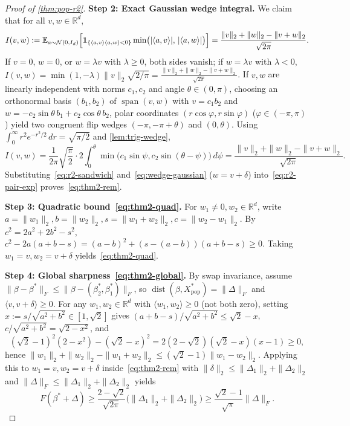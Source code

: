 \documentclass[11pt]{article}
\theoremstyle{plain}
\theoremstyle{remark}
\numberwithin{equation}{section}
\newcommand{\R}{\mathbb{R}}
\newcommand{\E}{\mathbb{E}}
\newcommand{\ind}{\mathbf{1}}
\newcommand{\ip}[2]{\langle #1, #2 \rangle}
\newcommand{\norm}[1]{\|#1\|}
\newcommand{\dist}{\operatorname{dist}}
\newcommand{\Fnorm}[1]{\|#1\|_F}
\begin{document}
\begin{proof}[Proof of \cref{thm:pop-r2}]
\textbf{Step 2: Exact Gaussian wedge integral.}
We claim that for all $v, w \in \R^d$,
\begin{equation}
  \label{eq:wedge-gaussian}
  I(v, w) := \E_{a \sim \mathcal{N}(0, I_d)}\Bigl[\ind_{\{\ip{a}{v}\ip{a}{w} < 0\}} \min\bigl(|\ip{a}{v}|,\, |\ip{a}{w}|\bigr)\Bigr]
  = \frac{\norm{v}_2 + \norm{w}_2 - \norm{v + w}_2}{\sqrt{2\pi}}.
\end{equation}
If $v = 0$, $w = 0$, or $w = \lambda v$ with $\lambda \ge 0$, both sides vanish; if $w = \lambda v$ with $\lambda < 0$, $I(v, w) = \min(1, -\lambda)\norm{v}_2\sqrt{2/\pi} = \frac{\norm{v}_2 + \norm{w}_2 - \norm{v+w}_2}{\sqrt{2\pi}}$. If $v, w$ are linearly independent with norms $c_1, c_2$ and angle $\theta \in (0, \pi)$, choosing an orthonormal basis $(b_1, b_2)$ of $\operatorname{span}(v, w)$ with $v = c_1 b_2$ and $w = -c_2\sin\theta\,b_1 + c_2\cos\theta\,b_2$, polar coordinates $(r\cos\varphi, r\sin\varphi)$ ($\varphi \in (-\pi, \pi)$) yield two congruent flip wedges $(-\pi, -\pi+\theta)$ and $(0, \theta)$. Using $\int_0^\infty r^2 e^{-r^2/2}\,dr = \sqrt{\pi/2}$ and \cref{lem:trig-wedge},
\[
  I(v, w) = \frac{1}{2\pi}\sqrt{\frac{\pi}{2}}\cdot 2\int_0^\theta \min\bigl(c_1\sin\psi, c_2\sin(\theta - \psi)\bigr)\,d\psi
  = \frac{\norm{v}_2 + \norm{w}_2 - \norm{v + w}_2}{\sqrt{2\pi}}.
\]
Substituting~\eqref{eq:r2-sandwich} and~\eqref{eq:wedge-gaussian} ($w = v + \delta$) into~\eqref{eq:r2-pair-exp} proves~\eqref{eq:thm2-rem}.

\textbf{Step 3: Quadratic bound~\eqref{eq:thm2-quad}.}
For $w_1 \ne 0, w_2 \in \R^d$, write $a = \norm{w_1}_2, b = \norm{w_2}_2, s = \norm{w_1 + w_2}_2, c = \norm{w_2 - w_1}_2$. By $c^2 = 2a^2 + 2b^2 - s^2$, $c^2 - 2a(a + b - s) = (a - b)^2 + (s - (a - b))(a + b - s) \ge 0$. Taking $w_1 = v, w_2 = v + \delta$ yields~\eqref{eq:thm2-quad}.

\textbf{Step 4: Global sharpness~\eqref{eq:thm2-global}.}
By swap invariance, assume $\Fnorm{\beta - \beta^*} \le \Fnorm{\beta - (\beta_2^*, \beta_1^*)}$, so $\dist(\beta, X_{\mathrm{pop}}^*) = \Fnorm{\Delta}$ and $\ip{v}{v + \delta} \ge 0$. For any $w_1, w_2 \in \R^d$ with $\ip{w_1}{w_2} \ge 0$ (not both zero), setting $x := s/\sqrt{a^2 + b^2} \in [1, \sqrt{2}]$ gives $(a + b - s)/\sqrt{a^2 + b^2} \le \sqrt{2} - x$, $c/\sqrt{a^2 + b^2} = \sqrt{2 - x^2}$, and
\[
  (\sqrt{2} - 1)^2(2 - x^2) - (\sqrt{2} - x)^2 = 2(2 - \sqrt{2})(\sqrt{2} - x)(x - 1) \ge 0,
\]
hence $\norm{w_1}_2 + \norm{w_2}_2 - \norm{w_1 + w_2}_2 \le (\sqrt{2} - 1)\norm{w_1 - w_2}_2$. Applying this to $w_1 = v, w_2 = v + \delta$ inside~\eqref{eq:thm2-rem} with $\norm{\delta}_2 \le \norm{\Delta_1}_2 + \norm{\Delta_2}_2$ and $\Fnorm{\Delta} \le \norm{\Delta_1}_2 + \norm{\Delta_2}_2$ yields
\[
  F(\beta^* + \Delta) \ge \frac{2 - \sqrt{2}}{\sqrt{2\pi}}\bigl(\norm{\Delta_1}_2 + \norm{\Delta_2}_2\bigr)
  \ge \frac{\sqrt{2} - 1}{\sqrt{\pi}}\Fnorm{\Delta}.
\]
\end{proof}
\end{document}
